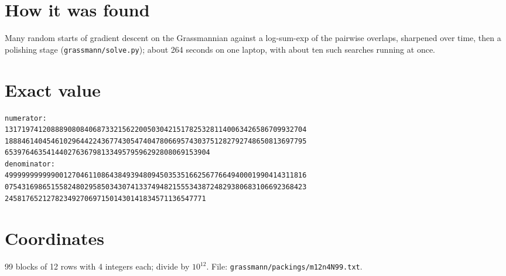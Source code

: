 \documentclass[11pt,a4paper]{article}
\begin{document}
\section{How it was found}
Many random starts of gradient descent on the Grassmannian against a log-sum-exp of the pairwise overlaps, sharpened over time, then a polishing stage (\texttt{grassmann/solve.py}); about 264 seconds on one laptop, with about ten such searches running at once.


\appendix
\section{Exact value}
{\small
\begin{verbatim}
numerator:
131719741208889080840687332156220050304215178253281140063426586709932704
188846140454610296442243677430547404780669574303751282792748650813697795
6539764635414402763679813349579596292808069153904
denominator:
499999999999001270461108643849394809450353516625677664940001990414311816
075431698651558248029585034307413374948215553438724829380683106692368423
245817652127823492706971501430141834571136547771
\end{verbatim}}

\section{Coordinates}
99 blocks of 12 rows with 4 integers each; divide by $10^{12}$. File: \texttt{grassmann/packings/m12n4N99.txt}.
{\tiny
\begin{multicols}{3}
\end{multicols}}
\end{document}
